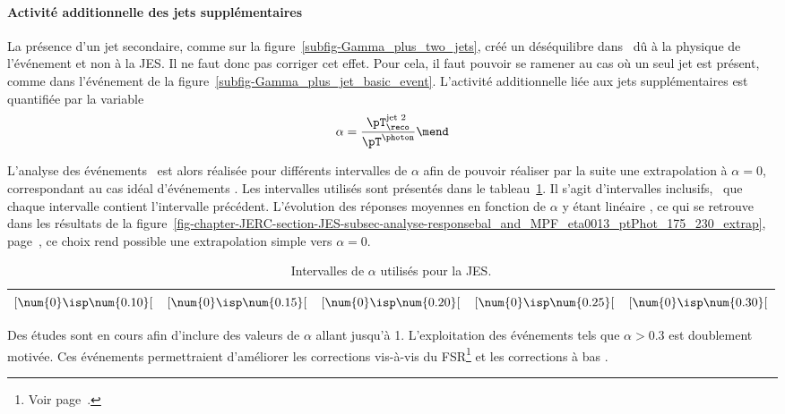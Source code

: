 \paragraph{Activité additionnelle des jets supplémentaires}
La présence d'un jet secondaire, comme sur la figure~\ref{subfig-Gamma_plus_two_jets}, créé un déséquilibre dans \Rbal\ dû à la physique de l'événement et non à la JES. Il ne faut donc pas corriger cet effet.
Pour cela, il faut pouvoir se ramener au cas où un seul jet est présent, comme dans l'événement de la figure~\ref{subfig-Gamma_plus_jet_basic_event}.
L'activité additionnelle liée aux jets supplémentaires est quantifiée par la variable
\begin{equation}
\alpha = \frac{\pT_\reco^\text{jet 2}}{\pT^{\photon}}
\mend
\label{eq-chapter-JERC-definition_alpha}
\end{equation}
\par L'analyse des événements \Gjets\ est alors réalisée pour différents intervalles de $\alpha$ afin de pouvoir réaliser par la suite une extrapolation à $\alpha=0$, correspondant au cas idéal d'événements \Gjet.
Les intervalles utilisés sont présentés dans le tableau~\ref{tab-alpha_intervalles}.
Il s'agit d'intervalles inclusifs, \ie\ que chaque intervalle contient l'intervalle précédent.
L'évolution des réponses moyennes en fonction de $\alpha$ y étant linéaire \aposteriori, ce qui se retrouve dans les résultats de la figure~\ref{fig-chapter-JERC-section-JES-subsec-analyse-responsebal_and_MPF_eta0013_ptPhot_175_230_extrap}, page~\pageref{fig-chapter-JERC-section-JES-subsec-analyse-responsebal_and_MPF_eta0013_ptPhot_175_230_extrap}, ce choix rend possible une extrapolation simple vers $\alpha=0$.
\begin{table}[h]
\centering
\begin{tabular}{ccccc}
\toprule
$[\num{0}\isp \num{0.10}[$ & $[\num{0}\isp \num{0.15}[$ & $[\num{0}\isp \num{0.20}[$ & $[\num{0}\isp \num{0.25}[$ & $[\num{0}\isp \num{0.30}[$ \\
\bottomrule
\end{tabular}
\caption{Intervalles de $\alpha$ utilisés pour la JES.}
\label{tab-alpha_intervalles}
\end{table}
\par Des études sont en cours afin d'inclure des valeurs de $\alpha$ allant jusqu'à \num{1}.
L'exploitation des événements tels que $\alpha>\num{0.3}$ est doublement motivée.
Ces événements permettraient d'améliorer les corrections vis-à-vis du FSR\footnote{Voir page~\pageref{subfig-fgraph-gq_qGamma_S-FSR_2jets}.} et les corrections à bas \pT.
